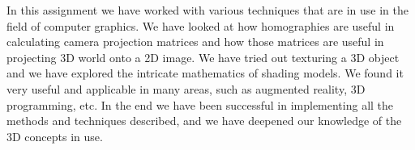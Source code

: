 In this assignment we have worked with various techniques that are in use in the field of computer graphics. We have looked at how homographies are useful in calculating camera projection matrices and how those matrices are useful in projecting 3D world onto a 2D image. We have tried out texturing a 3D object and we have explored the intricate mathematics of shading models. We found it very useful and applicable in many areas, such as augmented reality, 3D programming, etc. In the end we have been successful in implementing all the methods and techniques described, and we have deepened our knowledge of the 3D concepts in use.


